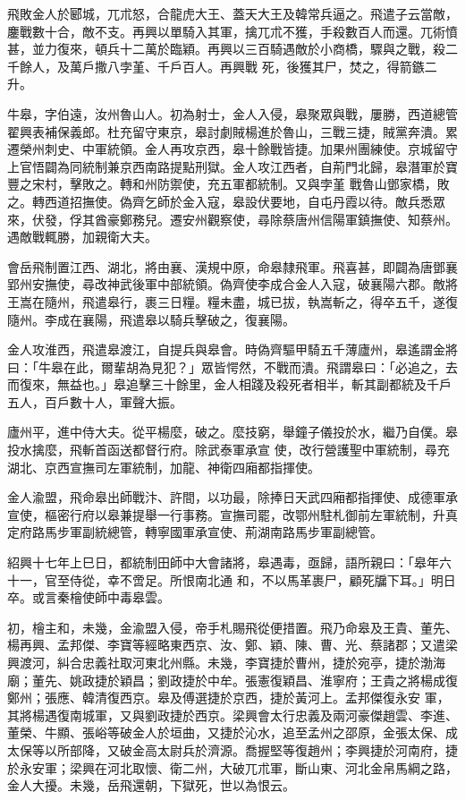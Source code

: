 \begin{pinyinscope}
 飛敗金人於郾城，兀朮怒，合龍虎大王、蓋天大王及韓常兵逼之。飛遣子云當敵，鏖戰數十合，敵不支。再興以單騎入其軍，擒兀朮不獲，手殺數百人而還。兀術憤甚，並力復來，頓兵十二萬於臨穎。再興以三百騎遇敵於小商橋，驟與之戰，殺二千餘人，及萬戶撒八孛堇、千戶百人。再興戰
 死，後獲其尸，焚之，得箭鏃二升。



 牛皋，字伯遠，汝州魯山人。初為射士，金人入侵，皋聚眾與戰，屢勝，西道總管翟興表補保義郎。杜充留守東京，皋討劇賊楊進於魯山，三戰三捷，賊黨奔潰。累遷榮州刺史、中軍統領。金人再攻京西，皋十餘戰皆捷。加果州團練使。京城留守上官悟闢為同統制兼京西南路提點刑獄。金人攻江西者，自荊門北歸，皋潛軍於寶豐之宋村，擊敗之。轉和州防禦使，充五軍都統制。又與孛堇
 戰魯山鄧家橋，敗之。轉西道招撫使。偽齊乞師於金入寇，皋設伏要地，自屯丹霞以待。敵兵悉眾來，伏發，俘其酋豪鄭務兒。遷安州觀察使，尋除蔡唐州信陽軍鎮撫使、知蔡州。遇敵戰輒勝，加親衛大夫。



 會岳飛制置江西、湖北，將由襄、漢規中原，命皋隸飛軍。飛喜甚，即闢為唐鄧襄郢州安撫使，尋改神武後軍中部統領。偽齊使李成合金人入寇，破襄陽六郡。敵將王嵩在隨州，飛遣皋行，裹三日糧。糧未盡，城已拔，執嵩斬之，得卒五千，遂復
 隨州。李成在襄陽，飛遣皋以騎兵擊破之，復襄陽。



 金人攻淮西，飛遣皋渡江，自提兵與皋會。時偽齊驅甲騎五千薄廬州，皋遙謂金將曰：「牛皋在此，爾輩胡為見犯？」眾皆愕然，不戰而潰。飛謂皋曰：「必追之，去而復來，無益也。」皋追擊三十餘里，金人相踐及殺死者相半，斬其副都統及千戶五人，百戶數十人，軍聲大振。



 廬州平，進中侍大夫。從平楊麼，破之。麼技窮，舉鐘子儀投於水，繼乃自僕。皋投水擒麼，飛斬首函送都督行府。除武泰軍承宣
 使，改行營護聖中軍統制，尋充湖北、京西宣撫司左軍統制，加龍、神衛四廂都指揮使。



 金人渝盟，飛命皋出師戰汴、許間，以功最，除捧日天武四廂都指揮使、成德軍承宣使，樞密行府以皋兼提舉一行事務。宣撫司罷，改鄂州駐札御前左軍統制，升真定府路馬步軍副統總管，轉寧國軍承宣使、荊湖南路馬步軍副總管。



 紹興十七年上巳日，都統制田師中大會諸將，皋遇毒，亟歸，語所親曰：「皋年六十一，官至侍從，幸不啻足。所恨南北通
 和，不以馬革裹尸，顧死牖下耳。」明日卒。或言秦檜使師中毒皋雲。



 初，檜主和，未幾，金渝盟入侵，帝手札賜飛從便措置。飛乃命皋及王貴、董先、楊再興、孟邦傑、李寶等經略東西京、汝、鄭、穎、陳、曹、光、蔡諸郡；又遣梁興渡河，糾合忠義社取河東北州縣。未幾，李寶捷於曹州，捷於宛亭，捷於渤海廟；董先、姚政捷於穎昌；劉政捷於中牟。張憲復穎昌、淮寧府；王貴之將楊成復鄭州；張應、韓清復西京。皋及傅選捷於京西，捷於黃河上。孟邦傑復永安
 軍，其將楊遇復南城軍，又與劉政捷於西京。梁興會太行忠義及兩河豪傑趙雲、李進、董榮、牛顯、張峪等破金人於垣曲，又捷於沁水，追至孟州之邵原，金張太保、成太保等以所部降，又破金高太尉兵於濟源。喬握堅等復趙州；李興捷於河南府，捷於永安軍；梁興在河北取懷、衛二州，大破兀朮軍，斷山東、河北金帛馬綱之路，金人大擾。未幾，岳飛還朝，下獄死，世以為恨云。




\end{pinyinscope}
